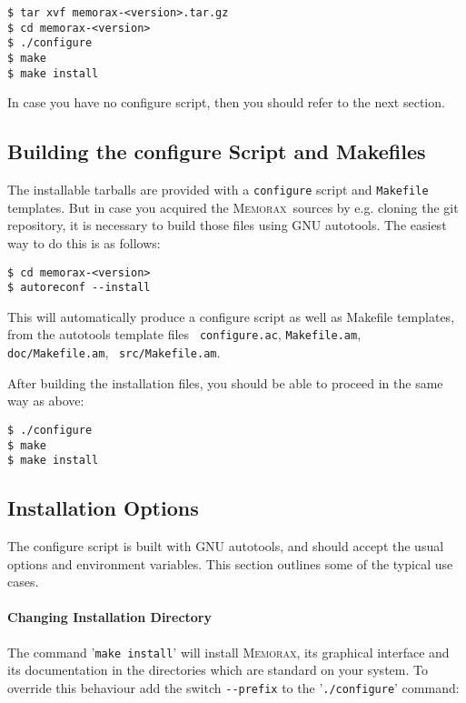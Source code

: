 \documentclass[a4paper]{article}
\newcommand{\memorax}{\textsc{Memorax}}
\begin{document}
\begin{verbatim}
$ tar xvf memorax-<version>.tar.gz
$ cd memorax-<version>
$ ./configure
$ make
$ make install
\end{verbatim}

In case you have no configure script, then you should refer to the
next section.

\subsection{Building the configure Script and Makefiles}

   The installable tarballs are provided with a {\tt configure} script
   and {\tt Makefile} templates. But in case you acquired the
   \memorax\ sources by e.g. cloning the git repository, it is
   necessary to build those files using GNU autotools. The easiest way
   to do this is as follows:

\begin{verbatim}
$ cd memorax-<version>
$ autoreconf --install
\end{verbatim}

   This will automatically produce a configure script as well as
   Makefile templates, from the autotools template files {\tt
     configure.ac}, {\tt Makefile.am}, {\tt doc/Makefile.am}, {\tt
     src/Makefile.am}.

   After building the installation files, you should be able to
   proceed in the same way as above:

\begin{verbatim}
$ ./configure
$ make
$ make install
\end{verbatim}


\subsection{Installation Options}

   The configure script is built with GNU autotools, and should accept
   the usual options and environment variables. This section outlines
   some of the typical use cases.

\paragraph{Changing Installation Directory}

   The command '\verb+make install+' will install \memorax, its graphical
   interface and its documentation in the directories which are
   standard on your system. To override this behaviour add the switch
   \verb+--prefix+ to the '\verb+./configure+' command:
\end{document}
